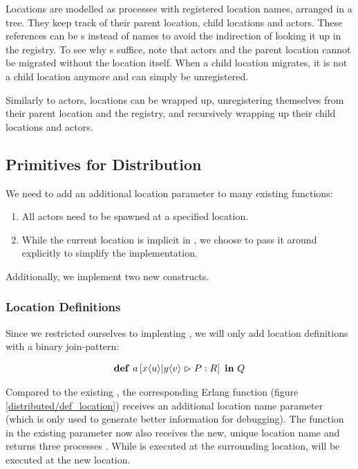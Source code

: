 Locations are modelled as processes with registered location names,
arranged in a tree.
They keep track of their parent location, child locations and actors.
These references can be \PID{}s instead of names
to avoid the indirection of looking it up in the registry.
To see why \PID{}s suffice, note that actors and the parent location
cannot be migrated without the location itself.
When a child location migrates, it is not a child location anymore and can
simply be unregistered.

Similarly to actors, locations can be wrapped up,
unregistering themselves from their parent location and the registry,
and recursively wrapping up their child locations and actors.



\subsection{Primitives for Distribution}

We need to add an additional location parameter to many existing functions:
\begin{enumerate}[nosep]
  \item
    All actors need to be spawned at a specified location.
  \item
    While the current location is implicit in \distjoincalc,
    we choose to pass it around explicitly to simplify the implementation.
\end{enumerate}

Additionally, we implement two new constructs.

\subsubsection{Location Definitions}
Since we restricted ourselves to implenting \corejoincalc,
we will only add location definitions with a binary join-pattern:

\begin{align*}
  \textbf{\textup{def}} \ a \left[ x\langle u\rangle | y\langle v\rangle \vartriangleright P : R \right] \ \textbf{\textup{in}} \ Q
\end{align*}

Compared to the existing ,
the corresponding Erlang function 
(figure \ref{distributed/def_location})
receives an additional location name parameter
(which is only used to generate better information for debugging).
The function in the existing parameter now also receives the new,
unique location name and returns three processes .
While  is executed at the surrounding location,
 will be executed at the new location.

